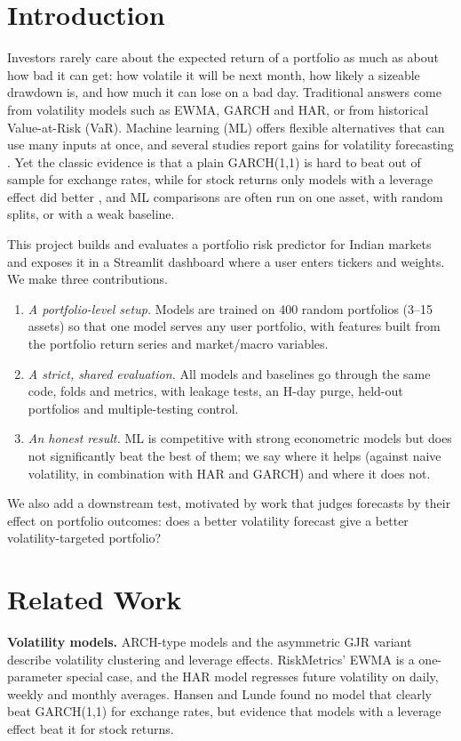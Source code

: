 \documentclass[conference,a4paper]{IEEEtran}
\begin{document}
\section{Introduction}
Investors rarely care about the expected return of a portfolio as much as about how bad it can get:
how volatile it will be next month, how likely a sizeable drawdown is, and how much it can lose on
a bad day. Traditional answers come from volatility models such as EWMA, GARCH and HAR, or from
historical Value-at-Risk (VaR). Machine learning (ML) offers flexible alternatives that can use many
inputs at once, and several studies report gains for volatility forecasting \cite{christensen2023}.
Yet the classic evidence is that a plain GARCH(1,1) is hard to beat out of sample for exchange rates,
while for stock returns only models with a leverage effect did better \cite{hansen2005}, and ML comparisons are often run on one asset, with random splits, or with a weak baseline.

This project builds and evaluates a portfolio risk predictor for Indian markets and exposes it in a
Streamlit dashboard where a user enters tickers and weights. We make three contributions.
\begin{enumerate}
\item \emph{A portfolio-level setup.} Models are trained on 400 random portfolios (3--15 assets) so
that one model serves any user portfolio, with features built from the portfolio return series and
market/macro variables.
\item \emph{A strict, shared evaluation.} All models and baselines go through the same code, folds
and metrics, with leakage tests, an H-day purge, held-out portfolios and multiple-testing control.
\item \emph{An honest result.} ML is competitive with strong econometric models but does not
significantly beat the best of them; we say where it helps (against naive volatility, in combination
with HAR and GARCH) and where it does not.
\end{enumerate}
We also add a downstream test, motivated by work that judges forecasts by their effect on portfolio
outcomes: does a better volatility forecast give a better volatility-targeted portfolio?

\section{Related Work}
\textbf{Volatility models.} ARCH-type models \cite{bollerslev1986} and the asymmetric GJR variant
\cite{glosten1993} describe volatility clustering and leverage effects. RiskMetrics' EWMA
\cite{riskmetrics1996} is a one-parameter special case, and the HAR model \cite{corsi2009} regresses
future volatility on daily, weekly and monthly averages. Hansen and Lunde \cite{hansen2005} found
no model that clearly beat GARCH(1,1) for exchange rates, but evidence that models with a leverage
effect beat it for stock returns.
\end{document}
